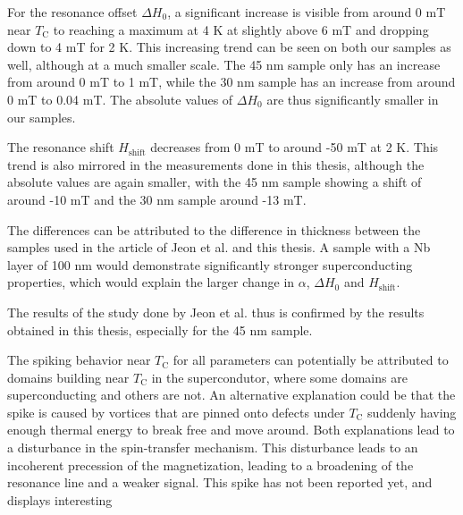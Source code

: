 For the resonance offset $\Delta H_0$, a significant increase is visible from around 0 mT near $T_\textrm{C}$ to reaching a maximum at 4 K at slightly above 6 mT and dropping down to 4 mT for 2 K. This increasing trend can be seen on both our samples as well, although at a much smaller scale. The 45 nm sample only has an increase from around 0 mT to 1 mT, while the 30 nm sample has an increase from around 0 mT to 0.04 mT. The absolute values of $\Delta H_0$ are thus significantly smaller in our samples.

The resonance shift $H_\textrm{shift}$ decreases from 0 mT to around -50 mT at 2 K. This trend is also mirrored in the measurements done in this thesis, although the absolute values are again smaller, with the 45 nm sample showing a shift of around -10 mT and the 30 nm sample around -13 mT.

The differences can be attributed to the difference in thickness between the samples used in the article of Jeon et al. and this thesis. A sample with a Nb layer of 100 nm would demonstrate significantly stronger superconducting properties, which would explain the larger change in $\alpha$, $\Delta H_0$ and $H_\textrm{shift}$.

The results of the study done by Jeon et al. \cite{Jeon2019} thus is confirmed by the results obtained in this thesis, especially for the 45 nm sample. 

The spiking behavior near $T_{\textrm{C}}$ for all parameters can potentially be attributed to domains building near $T_{\textrm{C}}$ in the supercondutor, where some domains are superconducting and others are not. An alternative explanation could be that the spike is caused by vortices that are pinned onto defects under $T_\textrm{C}$ suddenly having enough thermal energy to break free and move around. Both explanations lead to a disturbance in the spin-transfer mechanism. This disturbance leads to an incoherent precession of the magnetization, leading to a broadening of the resonance line and a weaker signal. This spike has not been reported yet, and displays interesting 
